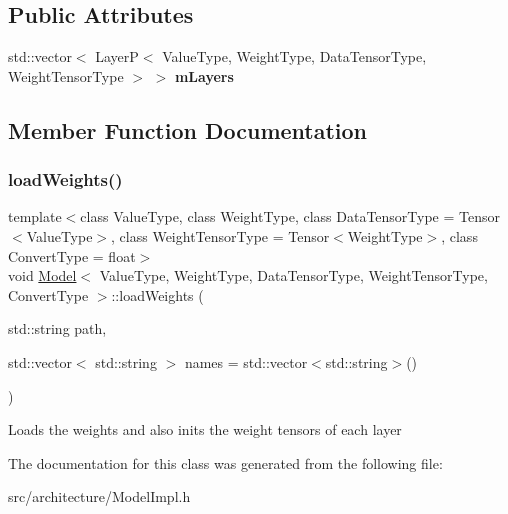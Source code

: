 \subsection*{Public Attributes}
\begin{DoxyCompactItemize}
\item 
\mbox{\label{classModel_aeb95301bfed843425127a5994f50f208}} 
std\+::vector$<$ LayerP$<$ Value\+Type, Weight\+Type, Data\+Tensor\+Type, Weight\+Tensor\+Type $>$ $>$ {\bfseries m\+Layers}
\end{DoxyCompactItemize}


\subsection{Member Function Documentation}
\mbox{\label{classModel_a10800ec7771d181bc93ea8a85206cbb0}} 
\subsubsection{\texorpdfstring{load\+Weights()}{loadWeights()}}
{\footnotesize\ttfamily template$<$class Value\+Type, class Weight\+Type, class Data\+Tensor\+Type = Tensor$<$\+Value\+Type$>$, class Weight\+Tensor\+Type = Tensor$<$\+Weight\+Type$>$, class Convert\+Type = float$>$ \\
void \hyperlink{classModel}{Model}$<$ Value\+Type, Weight\+Type, Data\+Tensor\+Type, Weight\+Tensor\+Type, Convert\+Type $>$\+::load\+Weights (\begin{DoxyParamCaption}\item[{std\+::string}]{path,  }\item[{std\+::vector$<$ std\+::string $>$}]{names = {\ttfamily std\+:\+:vector$<$std\+:\+:string$>$()} }\end{DoxyParamCaption})\hspace{0.3cm}{\ttfamily [inline]}}

Loads the weights and also inits the weight tensors of each layer 

The documentation for this class was generated from the following file\+:\begin{DoxyCompactItemize}
\item 
src/architecture/Model\+Impl.\+h\end{DoxyCompactItemize}
